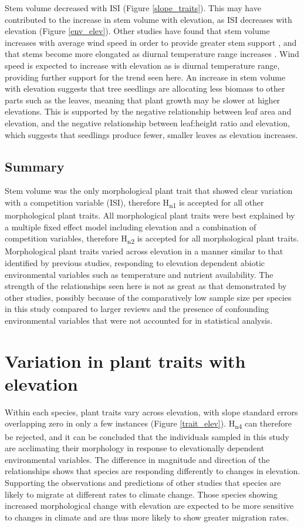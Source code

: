 \documentclass[a4paper, 11pt]{article}
\begin{document}
Stem volume decreased with ISI (Figure \ref{slope_traits}). This may have contributed to the increase in stem volume with elevation, as ISI decreases with elevation (Figure \ref{env_elev}). Other studies have found that stem volume increases with average wind speed in order to provide greater stem support \citep{Onoda2011}, and that stems become more elongated as diurnal temperature range increases \citep{Myster1995}. Wind speed is expected to increase with elevation as is diurnal temperature range, providing further support for the trend seen here. An increase in stem volume with elevation suggests that tree seedlings are allocating less biomass to other parts such as the leaves, meaning that plant growth may be slower at higher elevations. This is supported by the negative relationship between leaf area and elevation, and the negative relationship between leaf:height ratio and elevation, which suggests that seedlings produce fewer, smaller leaves as elevation increases.

\subsection*{Summary}
Stem volume was the only morphological plant trait that showed clear variation with a competition variable (ISI), therefore H\textsubscript{n1} is accepted for all other morphological plant traits. All morphological plant traits were best explained by a multiple fixed effect model including elevation and a combination of competition variables, therefore H\textsubscript{n2} is accepted for all morphological plant traits. Morphological plant traits varied across elevation in a manner similar to that identified by previous studies, responding to elevation dependent abiotic environmental variables such as temperature and nutrient availability. The strength of the relationships seen here is not as great as that demonstrated by other studies, possibly because of the comparatively low sample size per species in this study compared to larger reviews and the presence of confounding environmental variables that were not accounted for in statistical analysis.

\section{Variation in plant traits with elevation}
Within each species, plant traits vary across elevation, with slope standard errors overlapping zero in only a few instances (Figure \ref{trait_elev}). H\textsubscript{n4} can therefore be rejected, and it can be concluded that the individuals sampled in this study are acclimating their morphology in response to elevationally dependent environmental variables. The difference in magnitude and direction of the relationships shows that species are responding differently to changes in elevation. Supporting the observations and predictions of other studies that species are likely to migrate at different rates to climate change. Those species showing increased morphological change with elevation are expected to be more sensitive to changes in climate and are thus more likely to show greater migration rates.
\end{document}
